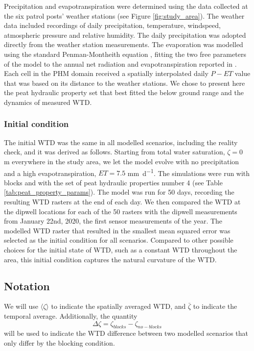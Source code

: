 \documentclass[bg, manuscript]{copernicus}
\begin{document}
Precipitation and evapotranspiration were determined using the data collected at the six patrol posts' weather stations (see Figure \ref{fig:study_area}).
The weather data included recordings of daily precipitation, temperature, windspeed, atmospheric pressure and relative humidity.
The daily precipitation was adopted directly from the weather station measurements.
The evaporation was modelled using the standard Penman-Montheith equation \citep{allenCropEvapotranspirationGuidelines1998}, fitting the two free parameters of the model to the annual net radiation and evapotranspiration reported in \citep{hiranoEvapotranspirationTropicalPeat2015}.
Each cell in the PHM domain received a spatially interpolated daily $P-ET$ value that was  based on its distance to the weather stations.
We chose to present here the peat hydraulic property set that best fitted the below ground range and the dynamics of measured WTD.


\subsubsection{Initial condition} \label{sec:initial-condition}
The initial WTD was the same in all modelled scenarios, including the reality check, and it was derived as follows.
Starting from total water saturation, $\zeta=0$ \unit{m} everywhere in the study area, we let the model evolve with no precipitation and a high evapotranspiration, $ET=7.5$ \unit{mm d^{-1}}.
The simulations were run with blocks and with the set of peat hydraulic properties number 4 (see Table \ref{tab:peat_property_params}).
The model was run for 50 days, recording the resulting WTD rasters at the end of each day.
We then compared the WTD  at the dipwell locations for each of the 50 rasters with the dipwell measurements from January 22nd, 2020, the first sensor measurements of the year.
The modelled WTD raster that resulted in the smallest mean squared error was selected as the initial condition for all scenarios.
Compared to other possible choices for the initial state of WTD, such as a constant WTD throughout the area, this initial condition captures the natural curvature of the WTD.


\subsection{Notation}

We will use $\langle \zeta \rangle$ to indicate the spatially averaged WTD, and $\bar{\zeta}$ to indicate the temporal average.
Additionally, the quantity 
\begin{equation} \label{eq:def_delta_zeta}
\Delta \zeta =  \zeta_{blocks} - \zeta_{no-blocks}
\end{equation}
will be used to indicate the WTD difference between two modelled scenarios that only differ by the blocking condition.
\end{document}
